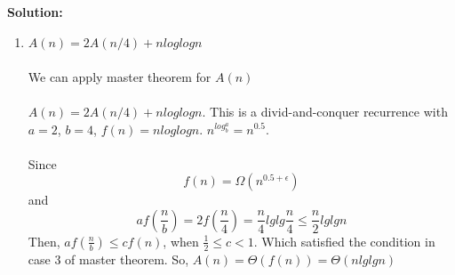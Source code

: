 \textbf{Solution:} 
\begin{enumerate}[label=(\alph*)]
	\item $A(n)=2A(n/4)+nloglogn$\\\\
	We can apply master theorem for $A(n)$\\\\
	$A(n)=2A(n/4)+nloglogn$. This is a divid-and-conquer recurrence with $a = 2$, $b = 4$, $f(n) = nloglogn$. $n^{log_b^a} = n^{0.5}$. 
	\\\\Since 
	$$f(n) = \Omega(n^{0.5 + \epsilon})$$ 
	and
	$$ af(\frac{n}{b}) = 2f(\frac{n}{4}) = \frac{n}{4}lglg\frac{n}{4} \leq \frac{n}{2}lglgn $$
	Then, $af(\frac{n}{b}) \leq cf(n)$, when $\frac{1}{2} \leq c < 1$. Which satisfied the condition in case 3 of master theorem. So, $A(n) = \Theta(f(n)) = \Theta(nlglgn)$


\end{enumerate}
